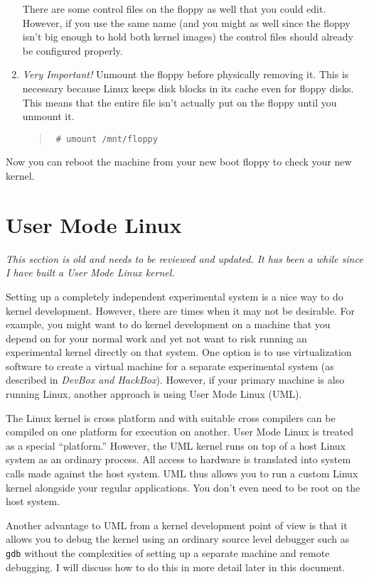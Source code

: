 \documentclass{article}
\newcommand{\command}[1]{\texttt{#1}}
\newenvironment{commands}
  {\begin{quote} \tt}
  {\end{quote}}
\begin{document}
\begin{enumerate}
  There are some control files on the floppy as well that you could edit. However, if you use
  the same name (and you might as well since the floppy isn't big enough to hold both kernel
  images) the control files should already be configured properly.

\item \emph{Very Important!} Unmount the floppy before physically removing it. This is necessary
  because Linux keeps disk blocks in its cache even for floppy disks. This means that the entire
  file isn't actually put on the floppy until you unmount it.
  \begin{commands}
    \# umount /mnt/floppy
  \end{commands}

\end{enumerate}

Now you can reboot the machine from your new boot floppy to check your new kernel.

\section{User Mode Linux}
\label{sec:UML}

\textit{This section is old and needs to be reviewed and updated. It has been a while since I
  have built a User Mode Linux kernel.}

Setting up a completely independent experimental system is a nice way to do kernel development.
However, there are times when it may not be desirable. For example, you might want to do kernel
development on a machine that you depend on for your normal work and yet not want to risk
running an experimental kernel directly on that system. One option is to use virtualization
software to create a virtual machine for a separate experimental system (as described in
\textit{DevBox and HackBox}). However, if your primary machine is also running Linux, another
approach is using User Mode Linux (UML).

The Linux kernel is cross platform and with suitable cross compilers can be compiled on one
platform for execution on another. User Mode Linux is treated as a special ``platform.''
However, the UML kernel runs on top of a host Linux system as an ordinary process. All access to
hardware is translated into system calls made against the host system. UML thus allows you to
run a custom Linux kernel alongside your regular applications. You don't even need to be root on
the host system.

Another advantage to UML from a kernel development point of view is that it allows you to debug
the kernel using an ordinary source level debugger such as \command{gdb} without the
complexities of setting up a separate machine and remote debugging. I will discuss how to do
this in more detail later in this document.
\end{document}
